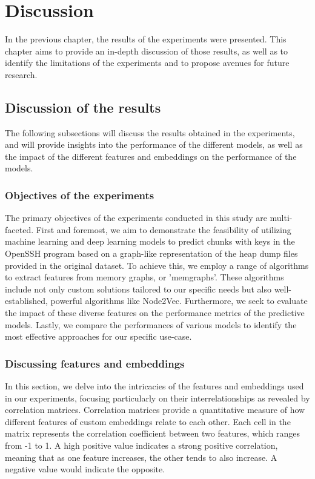 \chapter{Discussion}\label{chap:discussion}
In the previous chapter, the results of the experiments were presented. This chapter aims to provide an in-depth discussion of those results, as well as to identify the limitations of the experiments and to propose avenues for future research.

\section{Discussion of the results}
The following subsections will discuss the results obtained in the experiments, and will provide insights into the performance of the different models, as well as the impact of the different features and embeddings on the performance of the models.

\subsection{Objectives of the experiments}

The primary objectives of the experiments conducted in this study are multi-faceted. First and foremost, we aim to demonstrate the feasibility of utilizing machine learning and deep learning models to predict chunks with keys in the OpenSSH program based on a graph-like representation of the heap dump files provided in the original dataset. To achieve this, we employ a range of algorithms to extract features from memory graphs, or 'memgraphs'. These algorithms include not only custom solutions tailored to our specific needs but also well-established, powerful algorithms like Node2Vec. Furthermore, we seek to evaluate the impact of these diverse features on the performance metrics of the predictive models. Lastly, we compare the performances of various models to identify the most effective approaches for our specific use-case.

\subsection{Discussing features and embeddings}

In this section, we delve into the intricacies of the features and embeddings used in our experiments, focusing particularly on their interrelationships as revealed by correlation matrices. Correlation matrices provide a quantitative measure of how different features of custom embeddings relate to each other. Each cell in the matrix represents the correlation coefficient between two features, which ranges from -1 to 1. A high positive value indicates a strong positive correlation, meaning that as one feature increases, the other tends to also increase. A negative value would indicate the opposite.

